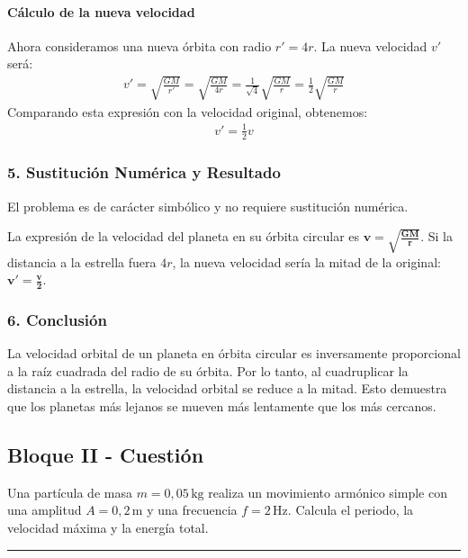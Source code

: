 \paragraph*{Cálculo de la nueva velocidad}
Ahora consideramos una nueva órbita con radio $r' = 4r$. La nueva velocidad $v'$ será:
\begin{gather}
    v' = \sqrt{\frac{GM}{r'}} = \sqrt{\frac{GM}{4r}} = \frac{1}{\sqrt{4}}\sqrt{\frac{GM}{r}} = \frac{1}{2}\sqrt{\frac{GM}{r}}
\end{gather}
Comparando esta expresión con la velocidad original, obtenemos:
\begin{gather}
    v' = \frac{1}{2}v
\end{gather}

\subsubsection*{5. Sustitución Numérica y Resultado}
El problema es de carácter simbólico y no requiere sustitución numérica.
\begin{cajaresultado}
La expresión de la velocidad del planeta en su órbita circular es $\boldsymbol{v = \sqrt{\frac{GM}{r}}}$. Si la distancia a la estrella fuera $4r$, la nueva velocidad sería la mitad de la original: $\boldsymbol{v' = \frac{v}{2}}$.
\end{cajaresultado}

\subsubsection*{6. Conclusión}
\begin{cajaconclusion}
La velocidad orbital de un planeta en órbita circular es inversamente proporcional a la raíz cuadrada del radio de su órbita. Por lo tanto, al cuadruplicar la distancia a la estrella, la velocidad orbital se reduce a la mitad. Esto demuestra que los planetas más lejanos se mueven más lentamente que los más cercanos.
\end{cajaconclusion}

\newpage

\subsection{Bloque II - Cuestión}
\label{subsec:A2_2014_jul_ext}

\begin{cajaenunciado}
Una partícula de masa $m=0,05\,\text{kg}$ realiza un movimiento armónico simple con una amplitud $A=0,2\,\text{m}$ y una frecuencia $f=2\,\text{Hz}$. Calcula el periodo, la velocidad máxima y la energía total. 
\end{cajaenunciado}
\hrule

